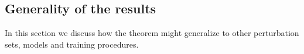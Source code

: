 




\subsection{Generality of the results}

In this section we discuss how the theorem might generalize to
other perturbation sets, models and training procedures.
